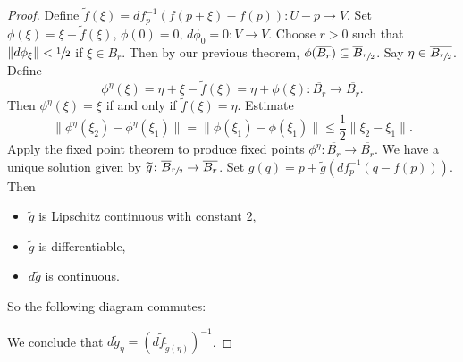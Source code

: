 \begin{proof}
    Define $\widetilde f(\xi) = df_p ^{-1}(f(p+\xi)-f(p)) \colon U-p \to V$. Set $\phi(\xi)=\xi - \widetilde f(\xi)$, $\phi(0)=0$, $d\phi_0=0 \colon V \to V$. Choose $r>0$ such that $\|d\phi _{\xi}\|<\sfrac{1}{2}$ if $\xi \in \overline{B_r}$. Then by our previous theorem, $\phi(\overline{B_r}) \subseteq \overline{B}_{\sfrac{r}{2}}$. Say $\eta \in \overline{B_{\sfrac{r}{2}}}$. Define \[
        \phi ^{\eta}(\xi)=\eta+\xi - \widetilde f(\xi) = \eta+\phi (\xi) \colon \overline{B_r} \to \overline{B_r}.
    \] Then $\phi^{\eta}(\xi)=\xi$ if and only if $\widetilde f(\xi)=\eta$. Estimate \[
    \|\phi^{\eta}(\xi_2)-\phi^{\eta}(\xi_1)\|=\|\phi(\xi_1)-\phi(\xi_1)\|\leq \frac{1}{2}\| \xi_2-\xi_1\|.
\] Apply the fixed point theorem to produce fixed points $\phi^{\eta}\colon \overline{B_r} \to \overline{B_r}$. We have a unique solution given by $\widetilde g \colon \overline{B}_{\sfrac{r}{2}} \to \overline{B_r}$. Set $g(q)=p + \widetilde g(df^{-1}_p(q-f(p)))$. Then 
\begin{itemize}
    \item $\widetilde g$ is Lipschitz continuous with constant 2,
    \item $\widetilde g$ is differentiable,
    \item $d\widetilde g$ is continuous. 
\end{itemize}
So the following diagram commutes:
\begin{figure}[H]
\centering
{}
\end{figure}
We conclude that $d\widetilde g_{\eta}=\left( d \widetilde f _{\widetilde g(\eta)} \right) ^{-1}$.
\end{proof}
